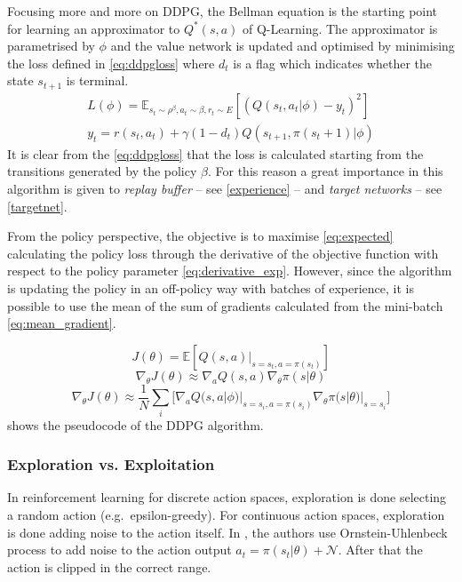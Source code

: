 Focusing more and more on DDPG, the Bellman equation is the starting point for learning an approximator to $Q^*(s,a)$ of Q-Learning. The approximator is parametrised by $\phi$ and the value network is updated and optimised by minimising the loss defined in \vref{eq:ddpgloss} where $d_t$ is a flag which indicates whether the  state $s_{t+1}$ is terminal.
\begin{equation}\label{eq:ddpgloss}
\begin{gathered}
L(\phi) = \mathbb{E}_{s_t\sim \rho^\beta, a_t\sim \beta,r_t\sim E}[(Q(s_t, a_t|\phi)-y_t)^2] \\
y_t = r(s_t, a_t) + \gamma (1-d_t)Q(s_{t+1}, \pi(s_t+1)|\phi)
\end{gathered}
\end{equation}
It is clear from the \vref{eq:ddpgloss} that the loss is calculated starting from the transitions generated by the policy $\beta$. For this reason a great importance in this algorithm is given to \textit{replay buffer} -- see \vref{experience} -- and \textit{target networks} -- see \vref{targetnet}.

From the policy perspective, the objective is to maximise \vref{eq:expected} calculating the policy loss through the derivative of the objective function with respect to the policy parameter \vref{eq:derivative_exp}. However, since the algorithm is updating the policy in an off-policy way with batches of experience, it is possible to use the mean of the sum of gradients calculated from the mini-batch \vref{eq:mean_gradient}.

\begin{equation}\label{eq:expected}
J(\theta) = \mathbb{E}[Q(s,a)|_{s=s_t,a=\pi(s_t)}]
\end{equation}	
\begin{equation}\label{eq:derivative_exp}
\nabla_{\theta} J(\theta) \approx \nabla_a Q(s,a) \nabla_{\theta}\pi(s|\theta)
\end{equation}	
\begin{equation}\label{eq:mean_gradient}
\nabla_{\theta} J(\theta) \approx \frac{1}{N}\sum_{i}\big[\nabla_a Q(s,a| \phi)|_{s=s_i, a = \pi(s_i)} \nabla_{\theta}\pi(s|\theta)|_{s=s_i}\big]
\end{equation}
 shows the pseudocode of the DDPG algorithm.

\subsubsection{Exploration vs. Exploitation} 
In reinforcement learning for discrete action spaces, exploration is done selecting a random action (e.g.\ epsilon-greedy). For continuous action spaces, exploration is done adding noise to the action itself. In \cite{lillicrap2015continuous}, the authors use Ornstein-Uhlenbeck process \cite{uhlenbeck1930theory} to add noise to the action output $
a_t = \pi(s_t|\theta) + \mathcal{N}$. After that the action is clipped in the correct range.


